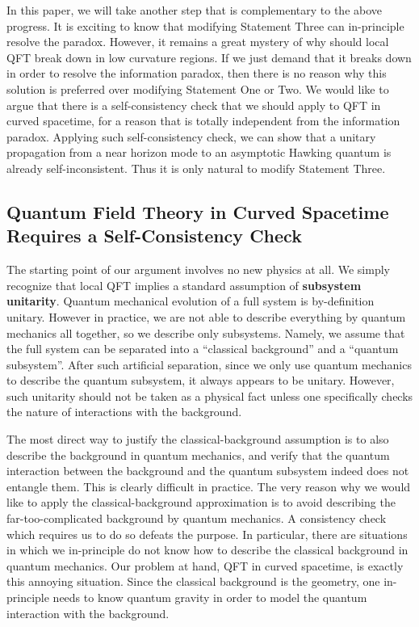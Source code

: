 \documentclass[aps,showpacs,onecolumn,floats,prd,superscriptaddress,nofootinbib]{revtex4-1}
\begin{document}
In this paper, we will take another step that is complementary to the above progress. It is exciting to know that modifying Statement Three can in-principle resolve the paradox. 
However, it remains a great mystery of why should local QFT break down in low curvature regions. 
If we just demand that it breaks down in order to resolve the information paradox, then there is no reason why this solution is preferred over modifying Statement One or Two. 
We would like to argue that there is a self-consistency check that we should apply to QFT in curved spacetime, for a reason that is totally independent from the information paradox.
Applying such self-consistency check, we can show that a unitary propagation from a near horizon mode to an asymptotic Hawking quantum is already self-inconsistent. 
Thus it is only natural to modify Statement Three.

\subsection{Quantum Field Theory in Curved Spacetime Requires a Self-Consistency Check}

The starting point of our argument involves no new physics at all.
We simply recognize that local QFT implies a standard assumption of {\bf subsystem unitarity}.
Quantum mechanical evolution of a full system is by-definition unitary. 
However in practice, we are not able to describe everything by quantum mechanics all together, so we describe only subsystems. 
Namely, we assume that the full system can be separated into a ``classical background'' and a ``quantum subsystem''. 
After such artificial separation, since we only use quantum mechanics to describe the quantum subsystem, it always appears to be unitary.
However, such unitarity should not be taken as a physical fact unless one specifically checks the nature of interactions with the background.

The most direct way to justify the classical-background assumption is to also describe the background in quantum mechanics, and verify that the quantum interaction between the background and the quantum subsystem indeed does not entangle them. 
This is clearly difficult in practice. 
The very reason why we would like to apply the classical-background approximation is to avoid describing the far-too-complicated background by quantum mechanics. 
A consistency check which requires us to do so defeats the purpose. 
In particular, there are situations in which we in-principle do not know how to describe the classical background in quantum mechanics. 
Our problem at hand, QFT in curved spacetime, is exactly this annoying situation. 
Since the classical background is the geometry, one in-principle needs to know quantum gravity in order to model the quantum interaction with the background. 
\end{document}
